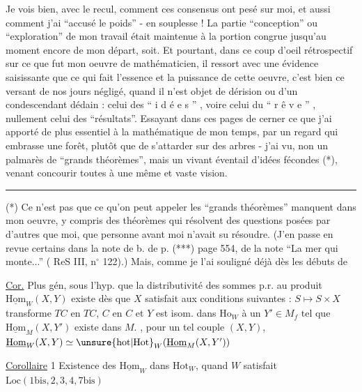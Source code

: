 Je vois \qquad bien, avec le recul, comment ces consensus ont pesé sur moi, et aussi comment j'ai ``accusé le poids'' - en souplesse ! La partie ``conception'' ou ``exploration'' de mon travail était maintenue à la portion congrue jusqu'au moment encore de mon départ, soit. Et pourtant, dans ce coup d'oeil rétrospectif sur ce que fut mon oeuvre de mathématicien, il ressort avec une évidence saisissante que ce qui fait l'essence et la puissance de cette oeuvre, c'est bien ce versant de nos jours négligé, quand il n'est objet de dérision ou d'un condescendant dédain : celui des `` i d é e s '' , voire celui du `` r ê v e '' , nullement celui des ``résultats''. Essayant dans ces pages de cerner ce que j'ai apporté de plus essentiel à la mathématique de mon temps, par un regard qui embrasse une forêt, plutôt que de s'attarder sur des arbres - j'ai vu, non un palmarès de ``grands théorèmes'', mais un vivant éventail d'idées fécondes (*), venant concourir toutes à une même et vaste vision.

\noindent\rule{1.8cm}{0.4pt}

(*) Ce n'est pas que ce qu'on peut appeler les ``grands théorèmes'' manquent dans mon oeuvre, y compris des théorèmes qui résolvent des questions posées par d'autres que moi, que personne avant moi n'avait su résoudre. (J'en passe en revue certains dans la note de b. de p. (***) page 554, de la note ``La mer qui monte...'' ( ReS III, n$^\circ$ 122).) Mais, comme je l'ai souligné déjà dès les débuts de



\uline{Cor.} Plus gén,  sous l'hyp.  que la distributivité des sommes p.r. au produit
$\underline{\mathrm{Hom}}_W(X,Y)$ existe dès que $X$ satisfait aux conditions suivantes :
$S\longmapsto S\times X$ transforme $TC$ en $TC$, $C$ en $C$ et 
$Y$ est isom. dans $\mathrm{Ho}_W$ à un $Y'\in M_f$ tel que
$\underline{\mathrm{Hom}}_M(X,Y')$ existe dans $M$. , pour un tel couple $(X,Y)$,
$\underline{\mathrm{Hom}}_W(X,Y)\simeq\unsure{\mathrm{hot}|\mathrm{Hot}}_W(\underline{\mathrm{Hom}}_M(X,Y'))$

\uline{Corollaire} 1 Existence des $\underline{\mathrm{Hom}}_W$ dans $\mathrm{Hot}_W$, quand $W$ satisfait $\mathrm{Loc}(1\mathrm{bis},2,3,4,7\mathrm{bis})$

